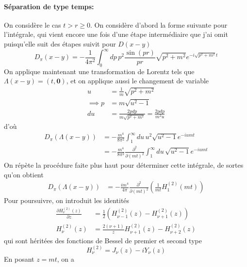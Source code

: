 \documentclass{article}
\numberwithin{equation}{section}
\begin{document}
\paragraph{Séparation de type temps:} On considère le cas $t > r \geq 0$. On considère d'abord la forme suivante pour l'intégrale, 
qui vient encore une fois d'une étape intermédiaire que j'ai omit puisqu'elle suit des étapes suivit pour $D(x - y)$
\begin{equation}
        D_{\pi}(x - y) = -\frac{1}{4 \pi^2} \int_0^{\infty } dp\, p^2 \frac{\sin(pr)}{pr} \sqrt{p^2 + m^2} e^{-i \sqrt{p^2 + m^2} t}
\end{equation} 
On applique maintenant une transformation de Lorentz tels que $\Lambda(x - y) = (t, \mathbf{0})$, et on applique aussi le changement de variable
\begin{align*}
        u &= \frac{1}{m} \sqrt{p^2 + m^2} \\
       \implies p &=  m\sqrt{u^2 - 1} \\
        du &= \frac{2p dp}{m \sqrt{p^2 + m^2}} = \frac{2p dp}{m^2 u}
\end{align*}
d'où
\begin{align*}
        D_{\pi}(\Lambda(x - y))  &= -\frac{m^4}{8\pi^2} \int_{1}^{\infty } du\, u^2\sqrt{u^2 - 1} e^{-i u mt} \\
                        &= -\frac{m^4}{8\pi^2}\frac{\partial^2}{\partial (mt)^2} \int_{1}^{\infty } du\, \sqrt{u^2 - 1} e^{-i u mt} 
\end{align*}
On répète la procédure faite plus haut pour déterminer cette intégrale, de sortes qu'on obtient
\begin{align*}
       D_{\pi}(\Lambda(x - y)) &= -\frac{im^4}{4\pi} \frac{\partial^2}{\partial (mt)^2} \left( \frac{1}{mt}H^{(2)}_{1}(mt) \right) 
\end{align*}
Pour poursuivre, on introduit les identités
\begin{align}
        \frac{\partial H_{\nu}^{(2)}(z)}{\partial z} &= \frac{1}{2} (H_{\nu  - 1}^{(2)}(z) - H_{\nu + 1}^{(2)}(z)) \\ 
        H_{\nu}^{(2)}(z) &= \frac{2 (\nu + 1)}{z}H_{\nu + 1}^{(2)}(z) - H_{\nu + 2}^{(2)}(z)
\end{align}
qui sont héritées des fonctions de Bessel de premier et second type
\begin{equation}
        H_{\nu}^{(2)} = J_{\nu}(z) - iY_{\nu}(z)
\end{equation} 
En posant $z = mt$, on a
\end{document}
